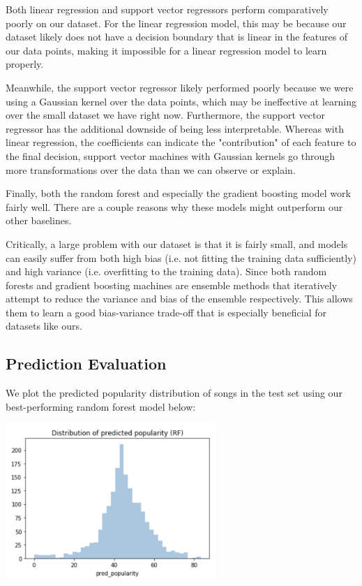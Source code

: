 \documentclass[journal]{IEEEtran}
\begin{document}
Both linear regression and support vector regressors perform comparatively poorly on our dataset. For the linear regression model, this may be because our dataset likely does not have a decision boundary that is linear in the features of our data points, making it impossible for a linear regression model to learn properly.

Meanwhile, the support vector regressor likely performed poorly because we were using a Gaussian kernel over the data points, which may be ineffective at learning over the small dataset we have right now. Furthermore, the support vector regressor has the additional downside of being less interpretable. Whereas with linear regression, the coefficients can indicate the "contribution" of each feature to the final decision, support vector machines with Gaussian kernels go through more transformations over the data than we can observe or explain.

Finally, both the random forest and especially the gradient boosting model work fairly well. There are a couple reasons why these models might outperform our other baselines.

Critically, a large problem with our dataset is that it is fairly small, and models can easily suffer from both high bias (i.e. not fitting the training data sufficiently) and high variance (i.e. overfitting to the training data). Since both random forests and gradient boosting machines are ensemble methods that iteratively attempt to reduce the variance and bias of the ensemble respectively. This allows them to learn a good bias-variance trade-off that is especially beneficial for datasets like ours.

\subsection{Prediction Evaluation}

We plot the predicted popularity distribution of songs in the test set using our best-performing random forest model below:

\includegraphics[width=8cm]{images/pred_popularity_distribution.png}
\end{document}
